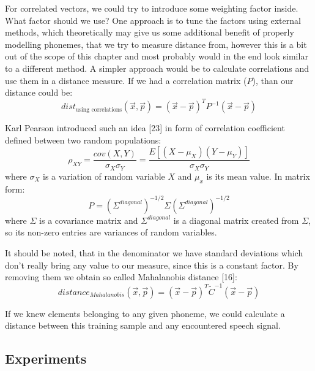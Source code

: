 \documentclass[12pt,a4paper,english]{article}
\begin{document}
For correlated vectors, we could try to introduce some weighting factor inside.\newline
What factor should we use?\newline
One approach is to tune the factors using external methods, which theoretically may give us some additional benefit of properly modelling phonemes, that we try to measure distance from, however this is a bit out of the scope of this chapter and most probably would in the end look similar to a different method.
A simpler approach would be to calculate correlations and use them in a distance measure.
If we had a correlation matrix ($P$), than our distance could be:
\begin{equation}
    dist_{\text{using correlations}}(\vec x, \vec p) = (\vec x - \vec p)^T P^{-1} (\vec x - \vec p)
\end{equation}
               
Karl Pearson introduced such an idea [23] in form of correlation coefficient defined between two random populations:  
\begin{equation}
    \rho_{XY} = \frac{cov(X, Y)}{\sigma_X \sigma_Y} = \frac{E[(X - \mu_X)(Y - \mu_Y)]}{\sigma_X \sigma_Y}
\end{equation}
where $\sigma_X$ is a variation of random variable $X$ and $\mu_x$ is its mean value. \newline
In matrix form:  
\begin{equation}
    P = (\Sigma^{diagonal})^{-1/2} \Sigma (\Sigma^{diagonal})^{-1/2}
\end{equation}
where $\Sigma$ is a covariance matrix and $\Sigma^{diagonal}$ is a diagonal matrix created from $\Sigma$,
so its non-zero entries are variances of random variables. \newline

It should be noted, that in the denominator we have standard deviations which don't really bring any value to our measure, since this is a constant factor.
By removing them we obtain so called Mahalanobis distance [16]:
\begin{equation}
    distance_{Mahalanobis}(\vec x, \vec p) = (\vec x - \vec p)^T \tilde C^{-1} (\vec x - \vec p)
\end{equation}

If we knew elements belonging to any given phoneme, we could calculate a distance between this training sample and any encountered speech signal.

\newpage
\newpage
\subsection{Experiments}
\end{document}
